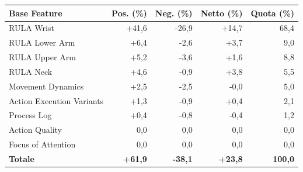 \begin{tabular*}{\linewidth}{@{}l@{\extracolsep{\fill}}rrrr@{}}
\toprule
\textbf{Base Feature} & \textbf{Pos. (\%)} & \textbf{Neg. (\%)} & \textbf{Netto (\%)} & \textbf{Quota (\%)} \\
\midrule
RULA Wrist & +41{,}6 & -26{,}9 & +14{,}7 & 68{,}4 \\
RULA Lower Arm & +6{,}4 & -2{,}6 & +3{,}7 & 9{,}0 \\
RULA Upper Arm & +5{,}2 & -3{,}6 & +1{,}6 & 8{,}8 \\
RULA Neck & +4{,}6 & -0{,}9 & +3{,}8 & 5{,}5 \\
Movement Dynamics & +2{,}5 & -2{,}5 & -0{,}0 & 5{,}0 \\
Action Execution Variants & +1{,}3 & -0{,}9 & +0{,}4 & 2{,}1 \\
Process Log & +0{,}4 & -0{,}8 & -0{,}4 & 1{,}2 \\
Action Quality & 0{,}0 & 0{,}0 & 0{,}0 & 0{,}0 \\
Focus of Attention & 0{,}0 & 0{,}0 & 0{,}0 & 0{,}0 \\
\midrule
\textbf{Totale} & \textbf{+61{,}9} & \textbf{-38{,}1} & \textbf{+23{,}8} & \textbf{100{,}0} \\
\bottomrule
\end{tabular*}
